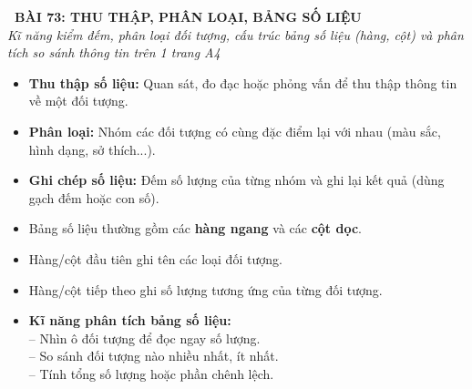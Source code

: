 \documentclass[11pt,a4paper]{article}
\begin{document}
\begin{tcolorbox}[
  enhanced,
  colback=white,
  colframe=primary,
  arc=3mm,
  boxrule=1.2pt,
  left=4mm, right=4mm, top=2.5mm, bottom=2.5mm,
  drop shadow=black!10!white
]
  \centering
  {\Large\bfseries\color{primary}\faBookmark\ BÀI 73: THU THẬP, PHÂN LOẠI, BẢNG SỐ LIỆU}\\[1.5mm]
  {\small\itshape\color{black!75}Kĩ năng kiểm đếm, phân loại đối tượng, cấu trúc bảng số liệu (hàng, cột) và phân tích so sánh thông tin trên 1 trang A4}
\end{tcolorbox}

\vspace{-2mm}


\noindent
\begin{minipage}[t]{0.49\textwidth}\vspace{0pt}
\begin{tcolorbox}[
  enhanced,
  colback=blue!4!white,
  colframe=blue!75!black,
  arc=2mm, boxrule=0.8pt,
  left=2mm, right=2mm, top=1.8mm, bottom=1.8mm,
  title={\footnotesize\bfseries\color{white}\faKey\ 1. Thu thập, phân loại và ghi chép}
]
{\footnotesize
\begin{itemize}\setlength{\itemsep}{1.5pt}\setlength{\leftskip}{-2.5mm}
  \item \textbf{Thu thập số liệu:} Quan sát, đo đạc hoặc phỏng vấn để thu thập thông tin về một đối tượng.
  \item \textbf{Phân loại:} Nhóm các đối tượng có cùng đặc điểm lại với nhau (màu sắc, hình dạng, sở thích...).
  \item \textbf{Ghi chép số liệu:} Đếm số lượng của từng nhóm và ghi lại kết quả (dùng gạch đếm hoặc con số).
\end{itemize}
}
\end{tcolorbox}
\end{minipage}
\hfill
\begin{minipage}[t]{0.49\textwidth}\vspace{0pt}
\begin{tcolorbox}[
  enhanced,
  colback=teal!4!white,
  colframe=teal!75!black,
  arc=2mm, boxrule=0.8pt,
  left=2mm, right=2mm, top=1.8mm, bottom=1.8mm,
  title={\footnotesize\bfseries\color{white}\faCheckSquare\ 2. Cấu trúc và đọc Bảng số liệu}
]
{\footnotesize
\begin{itemize}\setlength{\itemsep}{1.5pt}\setlength{\leftskip}{-2.5mm}
  \item Bảng số liệu thường gồm các \textbf{hàng ngang} và các \textbf{cột dọc}.
  \item Hàng/cột đầu tiên ghi tên các loại đối tượng.
  \item Hàng/cột tiếp theo ghi số lượng tương ứng của từng đối tượng.
  \item \textbf{Kĩ năng phân tích bảng số liệu:}\\
  -- Nhìn ô đối tượng để đọc ngay số lượng.\\
  -- So sánh đối tượng nào nhiều nhất, ít nhất.\\
  -- Tính tổng số lượng hoặc phần chênh lệch.
\end{itemize}
}
\end{tcolorbox}
\end{minipage}
\end{document}
